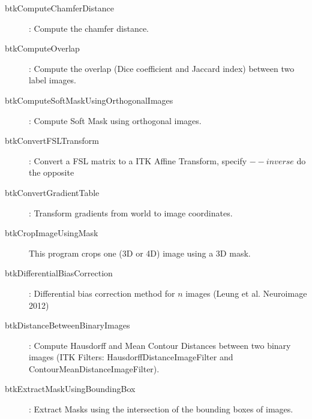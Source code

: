 \begin{description}
\item[btkComputeChamferDistance]: Compute the chamfer distance.
\item[btkComputeOverlap]: Compute the overlap (Dice coefficient and Jaccard index) between two label images.
\item[btkComputeSoftMaskUsingOrthogonalImages]: Compute Soft Mask using orthogonal images.
\item[btkConvertFSLTransform]: Convert a FSL matrix to a ITK Affine Transform, specify $--inverse$ do the opposite
\item[btkConvertGradientTable]: Transform gradients from world to image coordinates.
\item[btkCropImageUsingMask] This program crops one (3D or 4D) image using a 3D mask.
\item[btkDifferentialBiasCorrection]: Differential bias correction method for $n$ images (Leung et al. Neuroimage 2012) 
\item[btkDistanceBetweenBinaryImages]: Compute Hausdorff and Mean Contour Distances between two binary images (ITK Filters: HausdorffDistanceImageFilter and ContourMeanDistanceImageFilter).
\item[btkExtractMaskUsingBoundingBox]: Extract Masks using the intersection of the bounding boxes of images.

\end{description}
